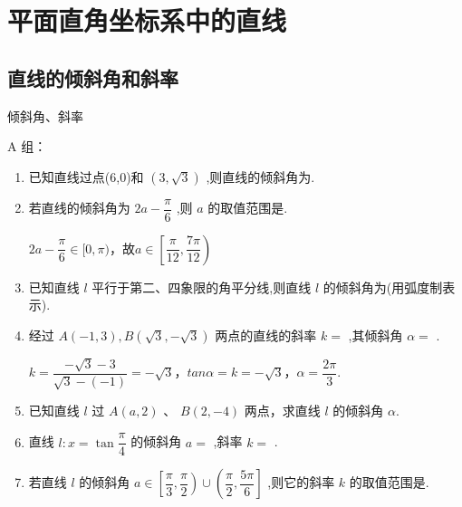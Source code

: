 \chapter*{平面直角坐标系中的直线}

\section*{直线的倾斜角和斜率}

\zsd 倾斜角、斜率

A 组：

\begin{enumerate}
    \item 已知直线过点(6,0)和 $\left( {3,\sqrt{3}}\right)$ ,则直线的倾斜角为.
    
    \item 若直线的倾斜角为 ${2a} - \dfrac{\pi }{6}$ ,则 $a$ 的取值范围是\blkda{$\left[\dfrac{\pi}{12}, \dfrac{7\pi}{12}\right)$}.
    \begin{jieda}
        $2a-\dfrac{\pi}{6} \in [0, \pi)$，故$a \in \left[\dfrac{\pi}{12}, \dfrac{7\pi}{12}\right)$
    \end{jieda}
    
    \item 已知直线 $l$ 平行于第二、四象限的角平分线,则直线 $l$ 的倾斜角为(用弧度制表示).
    
    \item 经过 $A\left( {-1,3}\right) ,B\left( {\sqrt{3}, - \sqrt{3}}\right)$ 两点的直线的斜率 $k =$ ,其倾斜角 $\alpha =$ .
    \begin{jieda}
        $k = \dfrac{-\sqrt{3}-3}{\sqrt{3} - (-1)} = -\sqrt{3}$，$tan\alpha = k = -\sqrt{3}$，$\alpha = \dfrac{2\pi}{3}$.
    \end{jieda}
    
    \item 已知直线 $l$ 过 $A\left( {a,2}\right)$ 、 $B\left( {2, - 4}\right)$ 两点，求直线 $l$ 的倾斜角 $\alpha$.
    \begin{jieda}
    \end{jieda}
    
    \item 直线 $l : x = \tan \dfrac{\pi }{4}$ 的倾斜角 $a =$ ,斜率 $k =$ .
    
    \item 若直线 $l$ 的倾斜角 $a \in  \left\lbrack  {\dfrac{\pi }{3},\dfrac{\pi }{2}}\right)  \cup  \left( {\dfrac{\pi }{2},\dfrac{5\pi }{6}}\right\rbrack$ ,则它的斜率 $k$ 的取值范围是\blkda[4]{$\left(-\infty, -\dfrac{\sqrt{3}}{3}\right] \bigcup \left[\sqrt{3}, +\infty\right)$}. 
\end{enumerate}

